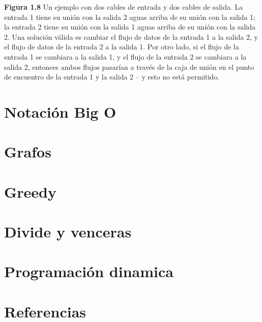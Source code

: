 \documentclass{article}
\begin{document}
\textbf{Figura 1.8} Un ejemplo con dos cables de entrada y dos cables de salida. La entrada 1 tiene su unión con la salida 2 aguas arriba de su unión con la salida 1; la entrada 2 tiene su unión con la salida 1 aguas arriba de su unión con la salida 2. Una solución válida es cambiar el flujo de datos de la entrada 1 a la salida 2, y el flujo de datos de la entrada 2 a la salida 1. Por otro lado, si el flujo de la entrada 1 se cambiara a la salida 1, y el flujo de la entrada 2 se cambiara a la salida 2, entonces ambos flujos pasarían a través de la caja de unión en el punto de encuentro de la entrada 1 y la salida 2 -- y esto no está permitido.


\newpage


\section{Notación Big O}
\section{Grafos}
\section{Greedy}
\section{Divide y venceras}
\section{Programación dinamica}
\section{Referencias}
\end{document}
